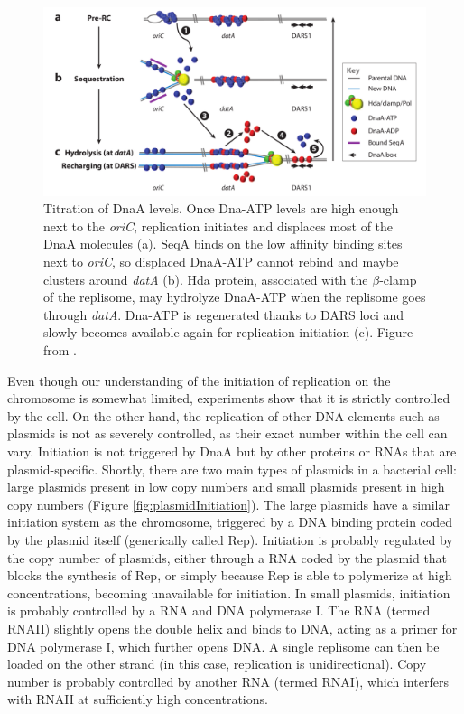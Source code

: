 \begin{figure}[!ht]
	\centering
	\includegraphics[width=0.8\linewidth]{figure/dnaASequestrationModel}
	\caption{Titration of DnaA levels. Once Dna-ATP levels are high enough next to the \textit{oriC}, replication initiates and displaces most of the DnaA molecules (a). SeqA binds on the low affinity binding sites next to \textit{oriC}, so displaced DnaA-ATP cannot rebind and maybe clusters around \textit{datA} (b). Hda protein, associated with the $\beta$-clamp of the replisome, may hydrolyze DnaA-ATP when the replisome goes through \textit{datA}. Dna-ATP is regenerated thanks to DARS loci and slowly becomes available again for replication initiation (c). Figure from \citet{leonard_regulation_2011}.}
	\label{fig:dnaATitration}
\end{figure}

Even though our understanding of the initiation of replication on the chromosome is somewhat limited, experiments show that it is strictly controlled by the cell. On the other hand, the replication of other DNA elements such as plasmids is not as severely controlled, as their exact number within the cell can vary. Initiation is not triggered by DnaA but by other proteins or RNAs that are plasmid-specific. Shortly, there are two main types of plasmids in a bacterial cell: large plasmids present in low copy numbers and small plasmids present in high copy numbers (Figure \ref{fig:plasmidInitiation}). The large plasmids have a similar initiation system as the chromosome, triggered by a DNA binding protein coded by the plasmid itself (generically called Rep). Initiation is probably regulated by the copy number of plasmids, either through a RNA coded by the plasmid that blocks the synthesis of Rep, or simply because Rep is able to polymerize at high concentrations, becoming unavailable for initiation. In small plasmids, initiation is probably controlled by a RNA and DNA polymerase I. The RNA (termed RNAII) slightly opens the double helix and binds to DNA, acting as a primer for DNA polymerase I, which further opens DNA. A single replisome can then be loaded on the other strand (in this case, replication is unidirectional). Copy number is probably controlled by another RNA (termed RNAI), which interfers with RNAII at sufficiently high concentrations.

